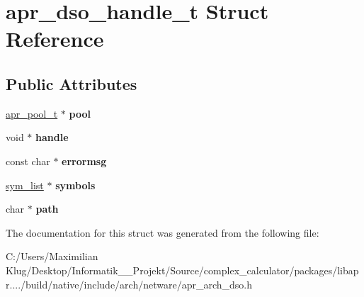 \hypertarget{structapr__dso__handle__t}{}\section{apr\+\_\+dso\+\_\+handle\+\_\+t Struct Reference}
\label{structapr__dso__handle__t}
\subsection*{Public Attributes}
\begin{DoxyCompactItemize}
\item 
\mbox{\label{structapr__dso__handle__t_a82adebd0d13a7029a019ae4b203231d3}} 
\mbox{\hyperlink{group__apr__pools_gaf137f28edcf9a086cd6bc36c20d7cdfb}{apr\+\_\+pool\+\_\+t}} $\ast$ {\bfseries pool}
\item 
\mbox{\label{structapr__dso__handle__t_ae6cec4aec10bfab9c900e5e780742037}} 
void $\ast$ {\bfseries handle}
\item 
\mbox{\label{structapr__dso__handle__t_a552832032c79c4cd8b813f27a2e5bca5}} 
const char $\ast$ {\bfseries errormsg}
\item 
\mbox{\label{structapr__dso__handle__t_a75493ee1847724a7de3223e4d21316ad}} 
\mbox{\hyperlink{structsym__list}{sym\+\_\+list}} $\ast$ {\bfseries symbols}
\item 
\mbox{\label{structapr__dso__handle__t_a39ae3919219c28d034405ce5c2b6bbc9}} 
char $\ast$ {\bfseries path}
\end{DoxyCompactItemize}


The documentation for this struct was generated from the following file\+:\begin{DoxyCompactItemize}
\item 
C\+:/\+Users/\+Maximilian Klug/\+Desktop/\+Informatik\+\_\+\_\+\+Projekt/\+Source/complex\+\_\+calculator/packages/libapr..../build/native/include/arch/netware/apr\+\_\+arch\+\_\+dso.\+h\end{DoxyCompactItemize}
